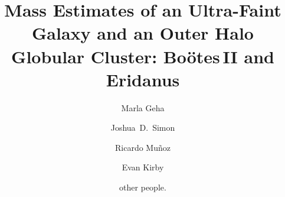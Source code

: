 \documentclass{../tex_files/emulateapj}
\begin{document}

\title{Mass Estimates of an Ultra-Faint Galaxy and an Outer Halo Globular Cluster:  Bo\"otes\,II and Eridanus}

%



\author{Marla Geha}

\author{Joshua\ D.\ Simon}


\author{Ricardo Mu\~noz}

\author{Evan Kirby}
\author{other people.}



\end{document}
